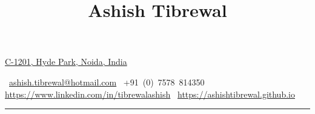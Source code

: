\documentclass[a4paper,10pt,oneside]{article}
\begin{document}

\title{Ashish Tibrewal}

\begin{subtitle}
\href{https://www.google.co.in/maps/place/Sarita+Vihar,+New+Delhi,+Delhi+110076/@28.5333247,77.2855647,15z/data=!3m1!4b1!4m8!1m2!2m1!1sc+497+sarita+vihar!3m4!1s0x390ce6a9463a72bb:0x25d52d1740214900!8m2!3d28.5279579!4d77.289785?dcr=0}
{C-1201, Hyde Park, Noida, India}
\par
\faEnvelope\,
\href{mailto:ashish.tibrewal@hotmail.com}
{ashish.tibrewal@hotmail.com}
\hfill \faPhone\,
+91~(0)~7578~814350
\hfill \faLinkedinSquare\,
\href{https://www.linkedin.com/in/tibrewalashish}
{https://www.linkedin.com/in/tibrewalashish}
\hfill \faBriefcase\,
\href{https://ashishtibrewal.github.io}
{https://ashishtibrewal.github.io}
\vspace{8pt}
\hrule
\end{subtitle}
\end{document}
